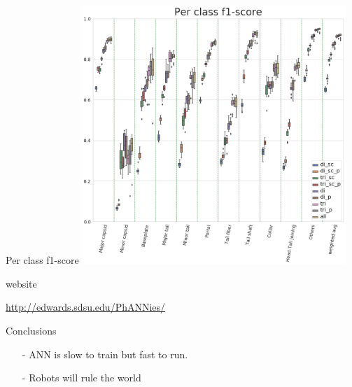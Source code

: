 \documentclass{beamer}
\begin{document}
\begin{frame}{Per class f1-score}
\includegraphics[width=0.75\textwidth]{f1_score_master_per_class_boxplot}
\end{frame}

\begin{frame}{website}
\begin{center}
\url{http://edwards.sdsu.edu/PhANNies/}
\end{center}
\end{frame}

\begin{frame}{Conclusions}
\begin{itemize}
\item [-] ANN is slow to train but fast to run.
\item [-] Robots will rule the world
\end{itemize}
\end{frame}
\end{document}
